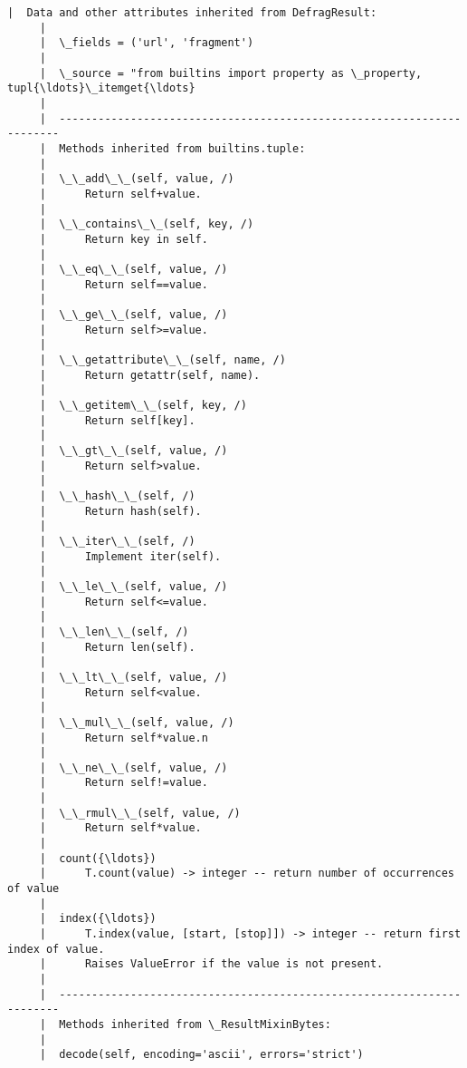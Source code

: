 \documentclass[11pt]{article}
\begin{document}
\begin{Verbatim}[commandchars=\\\{\}]
     |  Data and other attributes inherited from DefragResult:
     |  
     |  \_fields = ('url', 'fragment')
     |  
     |  \_source = "from builtins import property as \_property, tupl{\ldots}\_itemget{\ldots}
     |  
     |  ----------------------------------------------------------------------
     |  Methods inherited from builtins.tuple:
     |  
     |  \_\_add\_\_(self, value, /)
     |      Return self+value.
     |  
     |  \_\_contains\_\_(self, key, /)
     |      Return key in self.
     |  
     |  \_\_eq\_\_(self, value, /)
     |      Return self==value.
     |  
     |  \_\_ge\_\_(self, value, /)
     |      Return self>=value.
     |  
     |  \_\_getattribute\_\_(self, name, /)
     |      Return getattr(self, name).
     |  
     |  \_\_getitem\_\_(self, key, /)
     |      Return self[key].
     |  
     |  \_\_gt\_\_(self, value, /)
     |      Return self>value.
     |  
     |  \_\_hash\_\_(self, /)
     |      Return hash(self).
     |  
     |  \_\_iter\_\_(self, /)
     |      Implement iter(self).
     |  
     |  \_\_le\_\_(self, value, /)
     |      Return self<=value.
     |  
     |  \_\_len\_\_(self, /)
     |      Return len(self).
     |  
     |  \_\_lt\_\_(self, value, /)
     |      Return self<value.
     |  
     |  \_\_mul\_\_(self, value, /)
     |      Return self*value.n
     |  
     |  \_\_ne\_\_(self, value, /)
     |      Return self!=value.
     |  
     |  \_\_rmul\_\_(self, value, /)
     |      Return self*value.
     |  
     |  count({\ldots})
     |      T.count(value) -> integer -- return number of occurrences of value
     |  
     |  index({\ldots})
     |      T.index(value, [start, [stop]]) -> integer -- return first index of value.
     |      Raises ValueError if the value is not present.
     |  
     |  ----------------------------------------------------------------------
     |  Methods inherited from \_ResultMixinBytes:
     |  
     |  decode(self, encoding='ascii', errors='strict')
    

\end{Verbatim}
\end{document}
